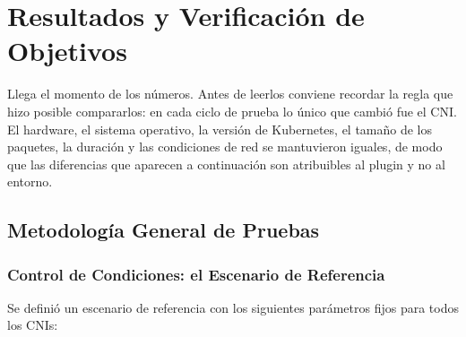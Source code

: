 \chapter{Resultados y Verificación de Objetivos} \label{sec:Resultados}

Llega el momento de los números. Antes de leerlos conviene recordar la regla que hizo posible compararlos: en cada ciclo de prueba lo único que cambió fue el CNI. El hardware, el sistema operativo, la versión de Kubernetes, el tamaño de los paquetes, la duración y las condiciones de red se mantuvieron iguales, de modo que las diferencias que aparecen a continuación son atribuibles al plugin y no al entorno.

\section{Metodología General de Pruebas}

\subsection{Control de Condiciones: el Escenario de Referencia}

Se definió un escenario de referencia con los siguientes parámetros fijos para todos los CNIs:

